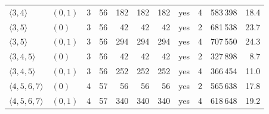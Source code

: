 \begin{tabular}{llrrrrrcrrr}
$ \langle 3,4\rangle  $ & $(0,1)$ & 3 & 56 & 182 & 182 & 182 & yes & 4 & 583\,398 & 18.4 \\
$ \langle 3,5\rangle  $ & $(0)$ & 3 & 56 & 42 & 42 & 42 & yes & 2 & 681\,538 & 23.7 \\
$ \langle 3,5\rangle  $ & $(0,1)$ & 3 & 56 & 294 & 294 & 294 & yes & 4 & 707\,550 & 24.3 \\
$ \langle 3,4,5\rangle  $ & $(0)$ & 3 & 56 & 42 & 42 & 42 & yes & 2 & 327\,898 & 8.7 \\
$ \langle 3,4,5\rangle  $ & $(0,1)$ & 3 & 56 & 252 & 252 & 252 & yes & 4 & 366\,454 & 11.0 \\
$ \langle 4,5,6,7\rangle  $ & $(0)$ & 4 & 57 & 56 & 56 & 56 & yes & 2 & 565\,638 & 17.8 \\
$ \langle 4,5,6,7\rangle  $ & $(0,1)$ & 4 & 57 & 340 & 340 & 340 & yes & 4 & 618\,648 & 19.2 \\
\bottomrule
\end{tabular}
